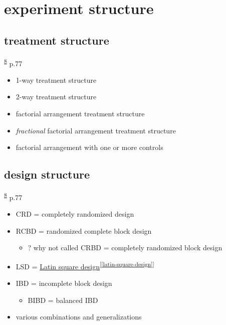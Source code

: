 \documentclass[
]{book}
\providecommand{\tightlist}{%
  \setlength{\itemsep}{0pt}\setlength{\parskip}{0pt}}
\theoremstyle{definition}
\theoremstyle{definition}
\theoremstyle{definition}
\theoremstyle{definition}
\theoremstyle{remark}
\begin{document}
\hypertarget{experiment-structure}{%
\section{experiment structure}\label{experiment-structure}}

\hypertarget{treatment-structure}{%
\subsection{treatment structure}\label{treatment-structure}}

\textsuperscript{\protect\hyperlink{ref-milliken2004}{8}} p.77

\begin{itemize}
\tightlist
\item
  1-way treatment structure
\item
  2-way treatment structure
\item
  factorial arrangement treatment structure
\item
  \emph{fractional} factorial arrangement treatment structure
\item
  factorial arrangement with one or more controls
\end{itemize}

\hypertarget{design-structure}{%
\subsection{design structure}\label{design-structure}}

\textsuperscript{\protect\hyperlink{ref-milliken2004}{8}} p.77

\begin{itemize}
\tightlist
\item
  CRD = completely randomized design
\item
  RCBD = randomized complete block design

  \begin{itemize}
  \tightlist
  \item
    ? why not called CRBD = completely randomized block design
  \end{itemize}
\item
  LSD = \protect\hyperlink{latin-square-design}{Latin square design}\textsuperscript{{[}\ref{latin-square-design}{]}}
\item
  IBD = incomplete block design

  \begin{itemize}
  \tightlist
  \item
    BIBD = balanced IBD
  \end{itemize}
\item
  various combinations and generalizations
\end{itemize}
\end{document}
